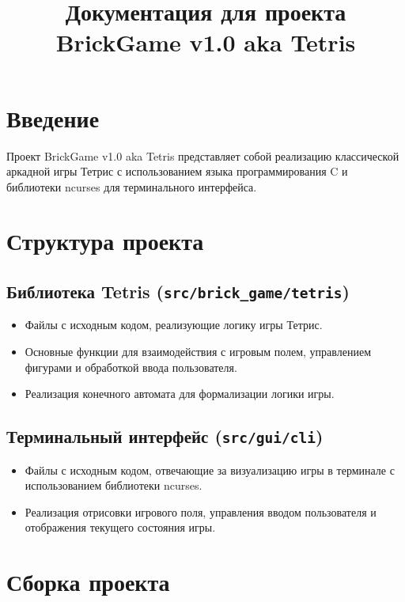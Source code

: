 \documentclass{article}
\begin{document}
\title{Документация для проекта BrickGame v1.0 aka Tetris}
\date{}
\maketitle

\section{Введение}

Проект BrickGame v1.0 aka Tetris представляет собой реализацию классической аркадной игры Тетрис с использованием языка программирования C и библиотеки ncurses для терминального интерфейса.

\section{Структура проекта}

\subsection{Библиотека Tetris (\texttt{src/brick\_game/tetris})}

\begin{itemize}[label=--]
    \item Файлы с исходным кодом, реализующие логику игры Тетрис.
    \item Основные функции для взаимодействия с игровым полем, управлением фигурами и обработкой ввода пользователя.
    \item Реализация конечного автомата для формализации логики игры.
\end{itemize}

\subsection{Терминальный интерфейс (\texttt{src/gui/cli})}

\begin{itemize}[label=--]
    \item Файлы с исходным кодом, отвечающие за визуализацию игры в терминале с использованием библиотеки ncurses.
    \item Реализация отрисовки игрового поля, управления вводом пользователя и отображения текущего состояния игры.
\end{itemize}

\section{Сборка проекта}
\end{document}
